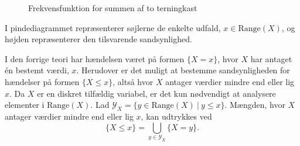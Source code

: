 \begin{eks}
\begin{figure}[H] \centering
{}
\caption{Frekvensfunktion for summen af to terningkast}\label{fig:eksempel_med_frekvensfunktion}
\end{figure}
%
I pindediagrammet repræsenterer søjlerne de enkelte udfald, $x\in \text{Range}(X)$, og højden repræsenterer den tilsvarende sandsynlighed.
\end{eks}


I den forrige teori har hændelsen været på formen $\{X=x\}$, hvor $X$ har antaget én bestemt værdi, $x$. Herudover er det muligt at bestemme sandsynligheden for hændelser på formen $\{X\leq x\}$, altså hvor $X$ antager værdier mindre end eller lig $x$. Da $X$ er en diskret tilfældig variabel, er det kun nødvendigt at analysere elementer i $\text{Range}(X)$.
%
%
Lad $\mathcal{Y}_X = \{y \in \text{Range}(X) \ | \ y\leq x\}$.
Mængden, hvor $X$ antager værdier mindre end eller lig $x$, kan udtrykkes ved $$\{X\leq x\}=\displaystyle\bigcup_{y \in \mathcal{Y}_X} \{X=y\}.$$

